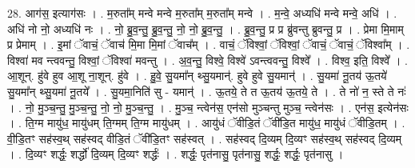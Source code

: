 \documentclass[17pt]{extarticle}
\begin{document}
28. आग॑स॒ इत्याग॑सः । . म॒रुता᳚म् मन्वे मन्वे म॒रुता᳚म् म॒रुता᳚म् मन्वे । . म॒न्वे॒ अध्यधि॑ मन्वे मन्वे॒ अधि॑ । . अधि॑ नो नो॒ अध्यधि॑ नः । . नो॒ ब्रु॒व॒न्तु॒ ब्रु॒व॒न्तु॒ नो॒ नो॒ ब्रु॒व॒न्तु॒ । . ब्रु॒व॒न्तु॒ प्र प्र ब्रु॑वन्तु ब्रुवन्तु॒ प्र । . प्रेमा मि॒माम् प्र प्रेमाम् । . इ॒मां ॅवाचं॒ ॅवाच॑ मि॒मा मि॒मां ॅवाच᳚म् । . वाचं॒ ॅविश्वां॒ ॅविश्वां॒ ॅवाचं॒ ॅवाचं॒ ॅविश्वा᳚म् । . विश्वा॑ मव न्त्ववन्तु॒ विश्वां॒ ॅविश्वा॑ मवन्तु । . अ॒व॒न्तु॒ विश्वे॒ विश्वे॑ ऽवन्त्ववन्तु॒ विश्वे᳚ । . विश्व॒ इति॒ विश्वे᳚ । . आ॒शून्. हु॑वे हुव आ॒शू ना॒शून्. हु॑वे । . हु॒वे॒ सु॒यमा᳚न् थ्सु॒यमान्॑. हुवे हुवे सु॒यमान्॑ । . सु॒यमा॑ नू॒तय॑ ऊ॒तये॑ सु॒यमा᳚न् थ्सु॒यमा॑ नू॒तये᳚ । . सु॒यमा॒निति॑ सु - यमान्॑ । . ऊ॒तये॒ ते त ऊ॒तय॑ ऊ॒तये॒ ते । . ते नो॑ न॒ स्ते ते नः॑ । . नो॒ मु॒ञ्च॒न्तु॒ मु॒ञ्च॒न्तु॒ नो॒ नो॒ मु॒ञ्च॒न्तु॒ । . मु॒ञ्च॒ न्त्वेन॑स॒ एन॑सो मुञ्चन्तु मुञ्च॒ न्त्वेन॑सः । . एन॑स॒ इत्येन॑सः । . ति॒ग्म मायु॑ध॒ मायु॑धम् ति॒ग्मम् ति॒ग्म मायु॑धम् । . आयु॑धं ॅवीडि॒तं ॅवी॑डि॒त मायु॑ध॒ मायु॑धं ॅवीडि॒तम् । . वी॒डि॒तꣳ सह॑स्व॒थ् सह॑स्वद् वीडि॒तं ॅवी॑डि॒तꣳ सह॑स्वत् । . सह॑स्वद् दि॒व्यम् दि॒व्यꣳ सह॑स्व॒थ् सह॑स्वद् दि॒व्यम् । . दि॒व्यꣳ शर्द्धः॒ शर्द्धो॑ दि॒व्यम् दि॒व्यꣳ शर्द्धः॑ । . शर्द्धः॒ पृत॑नासु॒ पृत॑नासु॒ शर्द्धः॒ शर्द्धः॒ पृत॑नासु । \newline
\end{document}
